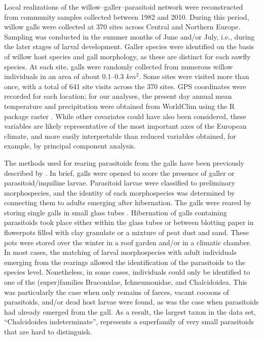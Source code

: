 \documentclass[12pt]{article}
\begin{document}
Local realizations of the willow–galler–parasitoid network were reconstructed
from community samples collected between 1982 and 2010. During this period,
willow galls were collected at 370 sites across Central and Northern Europe.
Sampling was conducted in the summer months of June and/or July, i.e., during
the later stages of larval development. Galler species were identified on the
basis of willow host species and gall morphology, as these are distinct for
each sawfly species. At each site, galls were randomly collected from numerous
willow individuals in an area of about 0.1–0.3 $km^2$. Some sites were visited
more than once, with a total of 641 site visits across the 370 sites. GPS
coordinates were recorded for each location; for our analyses, the present day
annual mean temperature and precipitation were obtained from WorldClim using
the R package raster \citep{Hijmans2015}. While other covariates could have
also been considered, these variables are likely representative of the most
important axes of the European climate, and more easily interpretable than
reduced variables obtained, for example, by principal component analysis.

The methods used for rearing parasitoids from the galls have been
previously described by \citealt{Kopelke2003}. In brief, galls were
opened to score the presence of galler or parasitoid/inquiline larvae. Parasitoid
larvae were classified to preliminary morphospecies, and the identity of each
morphospecies was determined by connecting them to adults emerging after
hibernation. The galls were reared by storing single galls in small glass
tubes \citep{Kopelke1985a}. Hibernation of galls containing parasitoids took place
either within the glass tubes or between blotting paper in flowerpots filled
with clay granulate or a mixture of peat dust and sand. These pots were stored
over the winter in a roof garden and/or in a climatic chamber. In most cases,
the matching of larval morphospecies with adult individuals emerging from the
rearings allowed the identification of the parasitoids to the species
level. Nonetheless, in some cases, individuals could only be identified to one
of the (super)families Braconidae, Ichneumonidae, and Chalcidoidea. This was
particularly the case when only remains of faeces, vacant cocoons of
parasitoids, and/or dead host larvae were found, as was the case when
parasitoids had already emerged from the gall. As a result, the largest taxon
in the data set, ``Chalcidoidea indeterminate'', represents a superfamily of
very small parasitoids that are hard to distinguish.
\end{document}
